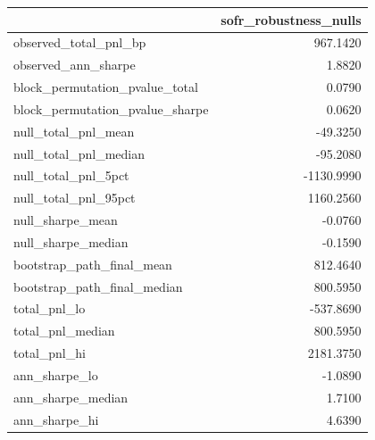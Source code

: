\begin{tabular}{lr}
\toprule
 & sofr\_robustness\_nulls \\
\midrule
observed\_total\_pnl\_bp & 967.1420 \\
observed\_ann\_sharpe & 1.8820 \\
block\_permutation\_pvalue\_total & 0.0790 \\
block\_permutation\_pvalue\_sharpe & 0.0620 \\
null\_total\_pnl\_mean & -49.3250 \\
null\_total\_pnl\_median & -95.2080 \\
null\_total\_pnl\_5pct & -1130.9990 \\
null\_total\_pnl\_95pct & 1160.2560 \\
null\_sharpe\_mean & -0.0760 \\
null\_sharpe\_median & -0.1590 \\
bootstrap\_path\_final\_mean & 812.4640 \\
bootstrap\_path\_final\_median & 800.5950 \\
total\_pnl\_lo & -537.8690 \\
total\_pnl\_median & 800.5950 \\
total\_pnl\_hi & 2181.3750 \\
ann\_sharpe\_lo & -1.0890 \\
ann\_sharpe\_median & 1.7100 \\
ann\_sharpe\_hi & 4.6390 \\
\bottomrule
\end{tabular}
